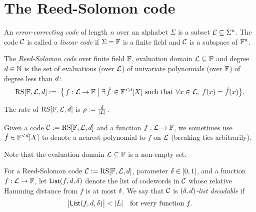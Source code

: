 \chapter{The Reed-Solomon code}

\begin{definition}\label{def:eccode}
    An \emph{error-correcting code} of length \(n\) over an alphabet \(\Sigma\) is a subset \(\mathcal{C} \subseteq \Sigma^n\). The code \(\mathcal{C}\) is called a \emph{linear code} if
    \(\Sigma = \mathbb{F}\) is a finite field and \(\mathcal{C}\) is a subspace of \({\mathbb{F}}^n\).
\end{definition}

\begin{definition}\label{def:rscode}
\leanok
    The \emph{Reed-Solomon code} over finite field $\mathbb{F}$, evaluation domain $\mathcal{L}\subseteq\mathbb{F}$ and degree $d\in\mathbb{N}$ is the set of evaluations (over $\mathcal{L}$) of univariate polynomials (over $\mathbb{F}$) of degree less than $d$:
    \[
        \mathrm{RS}[\mathbb{F},\mathcal{L},d]:=\; \bigl\{\, f : \mathcal{L} \to \mathbb{F} \;\big|\; \exists \,\hat{f} \,\in \mathbb{F}^{<d}[X]\text{ such that } \forall x \in \mathcal{L},\; f(x) = \hat{f}(x)\bigr\}.
    \]

    The rate of $\mathrm{RS}[\mathbb{F},\mathcal{L},d]$ is $\rho := \frac{d}{\lvert \mathcal{L} \rvert}$.

    Given a code $\mathcal{C} := \mathrm{RS}[\mathbb{F},\mathcal{L},d]$ and a function $f : \mathcal{L} \to \mathbb{F}$, we sometimes use $\hat{f} \in \mathbb{F}^{<d}[X]$ to denote a nearest polynomial to $f$ on $\mathcal{L}$ (breaking ties arbitrarily).
\end{definition}

\begin{remark}
Note that the evaluation domain $\mathcal{L}\subseteq\mathbb{F}$ is a non-empty set.
\end{remark}

\begin{definition}\label{def:list_decodable}
{}
    For a Reed-Solomon code $\mathcal{C} := \mathrm{RS}[\mathbb{F},\mathcal{L},d]$, parameter $\delta \in [0,1]$, 
    and a function $f:\mathcal{L}\to\mathbb{F}$, let $\mathsf{List}(f,d,\delta)$ denote the list 
    of codewords in $\mathcal{C}$ whose relative Hamming distance from $f$ is at most $\delta$.
    We say that $\mathcal{C}$ is \emph{$(\delta,d)$-list decodable} if 
    \[
    \bigl|\mathsf{List}(f,d,\delta)\bigr| < |L|
    \quad
    \text{for every function } f.
    \]
\end{definition}
    
